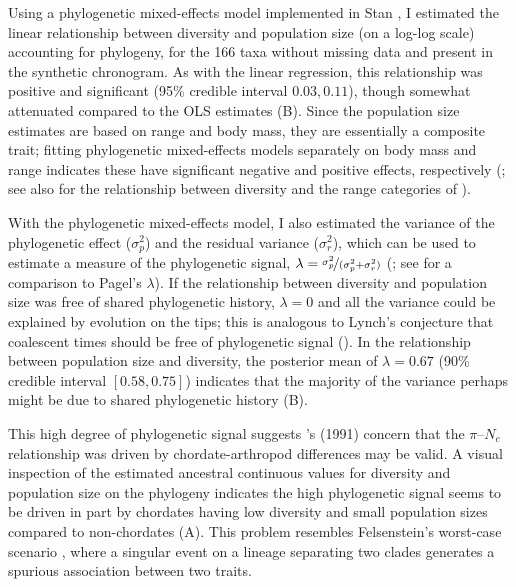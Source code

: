 \documentclass[9pt,lineno]{elife}
\begin{document}
Using a phylogenetic mixed-effects model
\citep{Lynch1991-tp,Hadfield2010-ql,De_Villemereuil2014-kt} implemented in Stan
\citep{Carpenter2017-xi,Stan_Development_Team2020-ea}, I estimated the linear
relationship between diversity and population size (on a log-log scale)
accounting for phylogeny, for the 166 taxa without missing data and present in
the synthetic chronogram. As with the linear regression, this relationship was
positive and significant (95\% credible interval $0.03, 0.11$), though somewhat
attenuated compared to the OLS estimates (B). Since
the population size estimates are based on range and body mass, they are
essentially a composite trait; fitting phylogenetic mixed-effects models
separately on body mass and range indicates these have significant negative and
positive effects, respectively (; see also
 for the relationship between diversity and the
range categories of \cite{Leffler2012-zj}).

With the phylogenetic mixed-effects model, I also estimated the variance of the
phylogenetic effect ($\sigma_p^2$) and the residual variance ($\sigma_r^2$),
which can be used to estimate a measure of the phylogenetic signal, $\lambda =
\nicefrac{\sigma_p^2}{(\sigma_p^2 + \sigma_r^2)}$
(\cite{Lynch1991-tp,De_Villemereuil2014-kt}; see \cite{Freckleton2002-ly} for a
comparison to Pagel's $\lambda$).  If the relationship between diversity and
population size was free of shared phylogenetic history, $\lambda = 0$ and all
the variance could be explained by evolution on the tips; this is analogous to
Lynch's conjecture that coalescent times should be free of phylogenetic signal
(\citeyear{Lynch2011-qv}). In the relationship between population size and
diversity, the posterior mean of $\lambda = 0.67$ (90\% credible interval
$[0.58, 0.75]$) indicates that the majority of the variance perhaps might be
due to shared phylogenetic history (B).

This high degree of phylogenetic signal suggests
\citeauthor{Gillespie1991-qa}'s (1991) concern that the $\pi$--$N_c$
relationship was driven by chordate-arthropod differences may be valid. A
visual inspection of the estimated ancestral continuous values for diversity
and population size on the phylogeny indicates the high phylogenetic signal
seems to be driven in part by chordates having low diversity and small
population sizes compared to non-chordates (A). This
problem resembles Felsenstein's worst-case scenario
\citep{Felsenstein1985-an,Uyeda2018-wf}, where a singular event on a
lineage separating two clades generates a spurious association between two
traits. 
\end{document}
